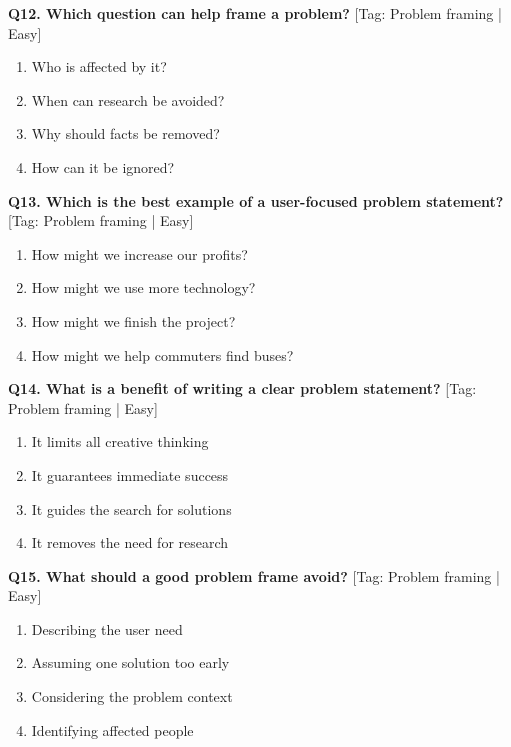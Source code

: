 \noindent\textbf{Q12. Which question can help frame a problem?} \hfill [Tag: Problem framing | Easy]
\begin{enumerate}[label=(\alph*),topsep=2pt,itemsep=1pt,partopsep=0pt,parsep=0pt]
    \item {Who is affected by it?}
    \item {When can research be avoided?}
    \item {Why should facts be removed?}
    \item {How can it be ignored?}
\end{enumerate}
\vspace{2mm}

\noindent\textbf{Q13. Which is the best example of a user-focused problem statement?} \hfill [Tag: Problem framing | Easy]
\begin{enumerate}[label=(\alph*),topsep=2pt,itemsep=1pt,partopsep=0pt,parsep=0pt]
    \item {How might we increase our profits?}
    \item {How might we use more technology?}
    \item {How might we finish the project?}
    \item {How might we help commuters find buses?}
\end{enumerate}
\vspace{2mm}

\noindent\textbf{Q14. What is a benefit of writing a clear problem statement?} \hfill [Tag: Problem framing | Easy]
\begin{enumerate}[label=(\alph*),topsep=2pt,itemsep=1pt,partopsep=0pt,parsep=0pt]
    \item {It limits all creative thinking}
    \item {It guarantees immediate success}
    \item {It guides the search for solutions}
    \item {It removes the need for research}
\end{enumerate}
\vspace{2mm}

\noindent\textbf{Q15. What should a good problem frame avoid?} \hfill [Tag: Problem framing | Easy]
\begin{enumerate}[label=(\alph*),topsep=2pt,itemsep=1pt,partopsep=0pt,parsep=0pt]
    \item {Describing the user need}
    \item {Assuming one solution too early}
    \item {Considering the problem context}
    \item {Identifying affected people}
\end{enumerate}
\vspace{2mm}

